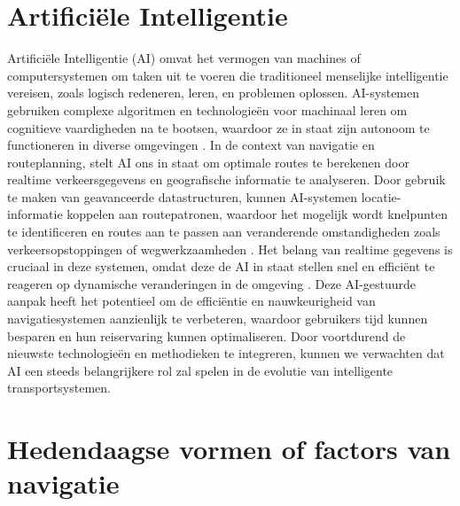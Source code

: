 \section{Artificiële Intelligentie}
\label{sec:artificiele-intelligentie}

Artificiële Intelligentie (AI) omvat het vermogen van machines of computersystemen om taken uit te voeren die traditioneel menselijke intelligentie vereisen, zoals logisch redeneren, leren, en problemen oplossen. AI-systemen gebruiken complexe algoritmen en technologieën voor machinaal leren om cognitieve vaardigheden na te bootsen, waardoor ze in staat zijn autonoom te functioneren in diverse omgevingen \autocite{Sabouret2020}. In de context van navigatie en routeplanning, stelt AI ons in staat om optimale routes te berekenen door realtime verkeersgegevens en geografische informatie te analyseren. Door gebruik te maken van geavanceerde datastructuren, kunnen AI-systemen locatie-informatie koppelen aan routepatronen, waardoor het mogelijk wordt knelpunten te identificeren en routes aan te passen aan veranderende omstandigheden zoals verkeersopstoppingen of wegwerkzaamheden \autocite{Soni2023a,Ruta2010}. Het belang van realtime gegevens is cruciaal in deze systemen, omdat deze de AI in staat stellen snel en efficiënt te reageren op dynamische veranderingen in de omgeving \autocite{Ciravegna2018}. Deze AI-gestuurde aanpak heeft het potentieel om de efficiëntie en nauwkeurigheid van navigatiesystemen aanzienlijk te verbeteren, waardoor gebruikers tijd kunnen besparen en hun reiservaring kunnen optimaliseren. Door voortdurend de nieuwste technologieën en methodieken te integreren, kunnen we verwachten dat AI een steeds belangrijkere rol zal spelen in de evolutie van intelligente transportsystemen.


\section{Hedendaagse vormen of factors van navigatie}
\label{sec:literatuuroverzicht}


